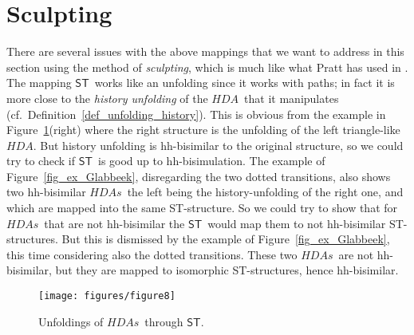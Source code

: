 \documentclass[submission,copyright,creativecommons]{eptcs}
\newcommand\HDA{\ensuremath{\mathit{HDA}}}
\newcommand\HDAs{\ensuremath{\mathit{HDAs}}}
\newcommand\hintost{\ensuremath{\mathsf{ST}}}
\begin{document}
\section{Sculpting}\label{subsec_sculpting}

There are several issues with the above mappings that we want to address in this section using the method of \textit{sculpting}, which is much like what Pratt has used in \cite{Pratt96reconcilingevent,Pratt00HDArev}.
The mapping \hintost\ works like an unfolding since it works with paths; in fact it is more close to the \textit{history unfolding} of the \HDA\ that it manipulates (cf.\ Definition~\ref{def_unfolding_history}). This is obvious from the example in Figure~\ref{fig_ex_interleaving_triangle}(right) where the right structure is the unfolding of the left triangle-like \HDA. But history unfolding is hh-bisimilar to the original structure, so we could try to check if \hintost\ is good up to hh-bisimulation. The example of Figure~\ref{fig_ex_Glabbeek}, disregarding the two dotted transitions, also shows two hh-bisimilar \HDAs\ the left being the history-unfolding of the right one, and which are mapped into the same ST-structure. So we could try to show that for \HDAs\ that are not hh-bisimilar the \hintost\ would map them to not hh-bisimilar ST-structures. But this is dismissed by the example of Figure~\ref{fig_ex_Glabbeek}, this time considering also the dotted transitions. These two \HDAs\ are not hh-bisimilar, but they are mapped to isomorphic ST-structures, hence hh-bisimilar.


\begin{figure}[tp]
\psfrag{HDA}{{\scriptsize on \HDAs}}
  \begin{center}
    \texttt{[image: figures/figure8]}
  \end{center}
\caption{Unfoldings of \HDAs\ through \hintost.}
\label{fig_ex_interleaving_triangle}
\end{figure}
\end{document}
